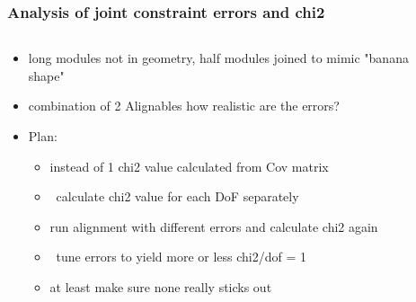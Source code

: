 \documentclass[aspectratio=1610, 12pt]{beamer}
\begin{document}
\begin{frame}\frametitle{Analysis of joint constraint errors and chi2}
  \begin{columns}
    \begin{column}[c]{0.7\textwidth}
      \begin{itemize}
        \item long modules not in geometry, half modules joined to mimic "banana shape"
        \item combination of 2 Alignables \to how realistic are the errors?
        \item Plan:
        \begin{itemize}
          \item instead of 1 chi2 value calculated from Cov matrix
          \item \to\, calculate chi2 value for each DoF separately
          \item run alignment with different errors and calculate chi2 again
          \item \to\, tune errors to yield more or less chi2/dof = 1
          \item at least make sure none really sticks out
        \end{itemize}
      \end{itemize}
    \end{column}
    \begin{column}[c]{0.3\textwidth}
    \end{column}
  \end{columns}
\end{frame}
\end{document}
